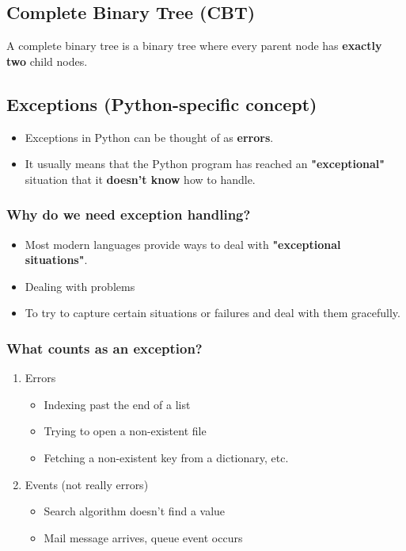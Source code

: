\documentclass[11pt]{article}
\begin{document}
\subsection{Complete Binary Tree (CBT)}
\label{sec:org4c7da88}
A complete binary tree is a binary tree where every parent node has \textbf{exactly two} child nodes.
\subsection{Exceptions (Python-specific concept)}
\label{sec:org1a80aa2}
\begin{itemize}
\item Exceptions in Python can be thought of as \textbf{errors}.
\item It usually means that the Python program has reached an \textbf{"exceptional"} situation that it \textbf{doesn't know} how to handle.
\end{itemize}
\subsubsection{Why do we need exception handling?}
\label{sec:org773c69f}
\begin{itemize}
\item Most modern languages provide ways to deal with \textbf{"exceptional situations"}.
\item Dealing with problems
\item To try to capture certain situations or failures and deal with them gracefully.
\end{itemize}
\subsubsection{What counts as an exception?}
\label{sec:org7166c6c}
\begin{enumerate}
\item Errors
\begin{itemize}
\item Indexing past the end of a list
\item Trying to open a non-existent file
\item Fetching a non-existent key from a dictionary, etc.
\end{itemize}

\item Events (not really errors)
\begin{itemize}
\item Search algorithm doesn't find a value
\item Mail message arrives, queue event occurs
\end{itemize}
\end{enumerate}
\end{document}
